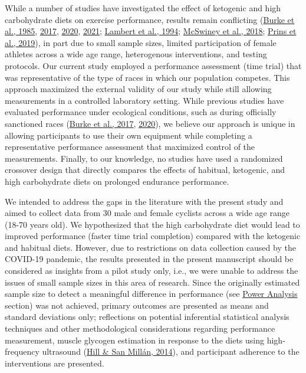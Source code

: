 \documentclass[]{cik}%
\begin{document}
While a number of studies have investigated the effect of ketogenic and
high carbohydrate diets on exercise performance, results remain
conflicting (\protect\hyperlink{ref-18}{Burke et al., 1985},
\protect\hyperlink{ref-19}{2017}, \protect\hyperlink{ref-20}{2020},
\protect\hyperlink{ref-16}{2021}; \protect\hyperlink{ref-7}{Lambert et
al., 1994}; \protect\hyperlink{ref-22}{McSwiney et al., 2018};
\protect\hyperlink{ref-23}{Prins et al., 2019}), in part due to small
sample sizes, limited participation of female athletes across a wide age
range, heterogenous interventions, and testing protocols. Our current
study employed a performance assessment (time trial) that was
representative of the type of races in which our population competes.
This approach maximized the external validity of our study while still
allowing measurements in a controlled laboratory setting. While previous
studies have evaluated performance under ecological conditions, such as
during officially sanctioned races (\protect\hyperlink{ref-19}{Burke et
al., 2017}, \protect\hyperlink{ref-20}{2020}), we believe our approach
is unique in allowing participants to use their own equipment while
completing a representative performance assessment that maximized
control of the measurements. Finally, to our knowledge, no studies have
used a randomized crossover design that directly compares the effects of
habitual, ketogenic, and high carbohydrate diets on prolonged endurance
performance.

We intended to address the gaps in the literature with the present study
and aimed to collect data from 30 male and female cyclists across a wide
age range (18-70 years old). We hypothesized that the high carbohydrate
diet would lead to improved performance (faster time trial completion)
compared with the ketogenic and habitual diets. However, due to
restrictions on data collection caused by the COVID-19 pandemic, the
results presented in the present manuscript should be considered as
insights from a pilot study only, i.e., we were unable to address the
issues of small sample sizes in this area of research. Since the
originally estimated sample size to detect a meaningful difference in
performance (see \protect\hyperlink{power-analysis}{Power Analysis}
section) was not achieved, primary outcomes are presented as means and
standard deviations only; reflections on potential inferential
statistical analysis techniques and other methodological considerations
regarding performance measurement, muscle glycogen estimation in
response to the diets using high-frequency ultrasound
(\protect\hyperlink{ref-29}{Hill \& San Millán, 2014}), and participant
adherence to the interventions are presented.
\end{document}
